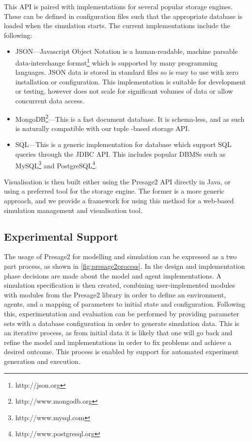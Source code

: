 This \ac{API} is paired with implementations for several popular storage
engines. These can be defined in configuration files such that the appropriate
database is loaded when the simulation starts. The current implementations
include the following:
\begin{itemize}
	\item JSON---Javascript Object Notation is a human-readable, machine parsable
	data-interchange format\footnote{http://json.org} which is supported by many
	programming languages. JSON data is stored in standard files so is easy to use
	with zero installation or configuration. This implementation is suitable for
	development or testing, however does not scale for significant volumes of data
	or allow concurrent data access.
	\item MongoDB\footnote{http://www.mongodb.org}---This is a fast document
	database. It is schema-less, and as such is naturally compatible with our tuple
	-based storage \ac{API}.
	\item SQL---This is a generic implementation for database which support SQL
	queries through the \ac{JDBC} \ac{API}. This includes popular \acp{DBMS} such
	as MySQL\footnote{http://www.mysql.com} and PostgreSQL\footnote{http://www.postgresql.org}.
\end{itemize}

Visualisation is then built either using the Presage2 \ac{API} directly in Java,
or using a preferred tool for the storage engine. The former is a more generic
approach, and we provide a framework for using this method for a web-based
simulation management and visualisation tool. 

\subsection{Experimental Support}

The usage of Presage2 for modelling and simulation can be expressed as a two
part process, as shown in \autoref{fig:presage2process}. In the design and
implementation phase decisions are made about the model and agent
implementations. A simulation specification is then created, combining 
user-implemented modules with modules from the Presage2 library in order to define
an environment, agents, and a mapping of parameters to initial state and
configuration. Following this, experimentation and evaluation can be performed
by providing parameter sets with a database configuration in order to generate
simulation data. This is an iterative process, as from initial data it is
likely that one will go back and refine the model and implementations in order
to fix problems and achieve a desired outcome. This process is enabled by
support for automated experiment generation and execution.

